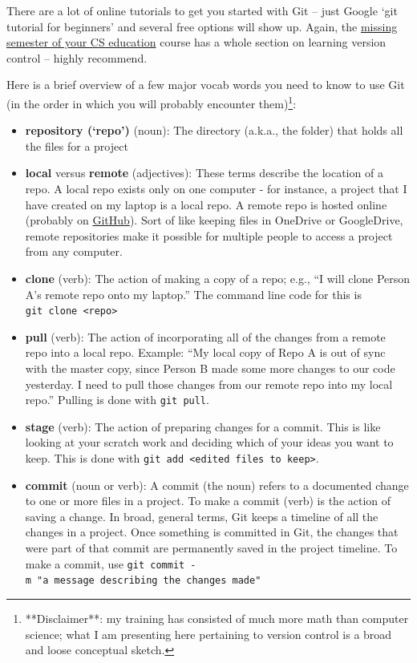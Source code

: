 \documentclass[
]{book}
\begin{document}
There are a lot of online tutorials to get you started with Git -- just Google `git tutorial for beginners' and several free options will show up. Again, the \href{https://missing.csail.mit.edu/2020/version-control/}{missing semester of your CS education} course has a whole section on learning version control -- highly recommend.

Here is a brief overview of a few major vocab words you need to know to use Git (in the order in which you will probably encounter them)\footnote{**Disclaimer**: my training has consisted of much more math than computer science; what I am presenting here pertaining to version control is a broad and loose conceptual sketch.}:

\begin{itemize}
\item
  \textbf{repository (`repo')} (noun): The directory (a.k.a., the folder) that holds all the files for a project
\item
  \textbf{local} versus \textbf{remote} (adjectives): These terms describe the location of a repo. A local repo exists only on one computer - for instance, a project that I have created on my laptop is a local repo. A remote repo is hosted online (probably on \href{https://github.com/}{GitHub}). Sort of like keeping files in OneDrive or GoogleDrive, remote repositories make it possible for multiple people to access a project from any computer.
\item
  \textbf{clone} (verb): The action of making a copy of a repo; e.g., ``I will clone Person A's remote repo onto my laptop.'' The command line code for this is \texttt{git\ clone\ \textless{}repo\textgreater{}}
\item
  \textbf{pull} (verb): The action of incorporating all of the changes from a remote repo into a local repo. Example: ``My local copy of Repo A is out of sync with the master copy, since Person B made some more changes to our code yesterday. I need to pull those changes from our remote repo into my local repo.'' Pulling is done with \texttt{git\ pull}.
\item
  \textbf{stage} (verb): The action of preparing changes for a commit. This is like looking at your scratch work and deciding which of your ideas you want to keep. This is done with \texttt{git\ add\ \textless{}edited\ files\ to\ keep\textgreater{}}.
\item
  \textbf{commit} (noun or verb): A commit (the noun) refers to a documented change to one or more files in a project. To make a commit (verb) is the action of saving a change. In broad, general terms, Git keeps a timeline of all the changes in a project. Once something is committed in Git, the changes that were part of that commit are permanently saved in the project timeline. To make a commit, use \texttt{git\ commit\ -m\ "a\ message\ describing\ the\ changes\ made"}

\end{itemize}
\end{document}
